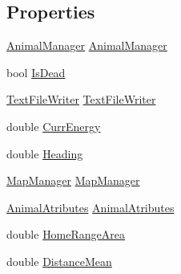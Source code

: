 \subsection*{Properties}
\begin{DoxyCompactItemize}
\item 
\hyperlink{class_p_a_z___dispersal_1_1_animal_manager}{Animal\-Manager} \hyperlink{class_p_a_z___dispersal_1_1_animal_a93434cdcadd8cc60adfd8f6257863d63}{Animal\-Manager}
\item 
bool \hyperlink{class_p_a_z___dispersal_1_1_animal_ade4ca84cbd927faa7ef3e502693543d9}{Is\-Dead}
\item 
\hyperlink{class_p_a_z___dispersal_1_1_text_file_writer}{Text\-File\-Writer} \hyperlink{class_p_a_z___dispersal_1_1_animal_a67c037bed748f53627f9ae487e30bcd4}{Text\-File\-Writer}
\item 
double \hyperlink{class_p_a_z___dispersal_1_1_animal_ae0a8190be3a3759481e75ff73ccb3df7}{Curr\-Energy}
\item 
double \hyperlink{class_p_a_z___dispersal_1_1_animal_abf813d728a950aa945ab0cedbd180b0c}{Heading}
\item 
\hyperlink{class_p_a_z___dispersal_1_1_map_manager}{Map\-Manager} \hyperlink{class_p_a_z___dispersal_1_1_animal_ae701729b17e958156ab9d9d962a97136}{Map\-Manager}
\item 
\hyperlink{class_p_a_z___dispersal_1_1_animal_atributes}{Animal\-Atributes} \hyperlink{class_p_a_z___dispersal_1_1_animal_a4e9302f08068b0198e38394588e4ae4b}{Animal\-Atributes}
\item 
double \hyperlink{class_p_a_z___dispersal_1_1_animal_aef9f44560e29734b8768eb4bf742e8bf}{Home\-Range\-Area}
\item 
double \hyperlink{class_p_a_z___dispersal_1_1_animal_a1d9ab58dca1086c53d3f4529951a4726}{Distance\-Mean}

\end{DoxyCompactItemize}
